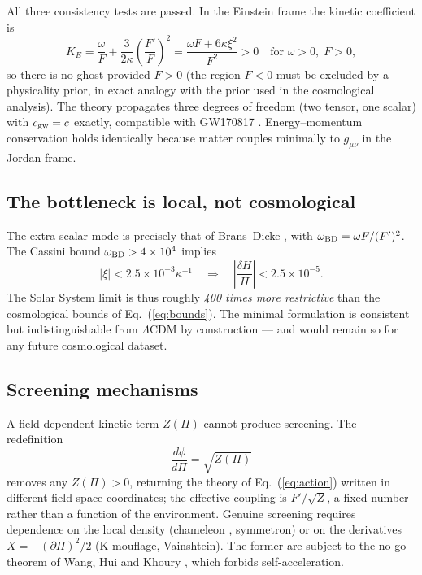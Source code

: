 \documentclass[aps,prd,twocolumn,superscriptaddress,nofootinbib,floatfix]{revtex4-2}
\newcommand{\LCDM}{\ensuremath{\Lambda}CDM}
\begin{document}
All three consistency tests are passed. In the Einstein frame the
kinetic coefficient is
%
\begin{equation}
K_E=\frac{\omega}{F}+\frac{3}{2\kappa}\left(\frac{F'}{F}\right)^2
=\frac{\omega F+6\kappa\xi^2}{F^2}>0
\quad\text{for }\omega>0,\;F>0,
\label{eq:noghost}
\end{equation}
%
so there is no ghost provided $F>0$ (the region $F<0$ must be excluded
by a physicality prior, in exact analogy with the prior used in the
cosmological analysis). The theory propagates three degrees of freedom
(two tensor, one scalar) with $c_{\rm gw}=c$ exactly, compatible with
GW170817 \cite{GW170817}. Energy--momentum conservation holds
identically because matter couples minimally to $g_{\mu\nu}$ in the
Jordan frame.

\subsection{The bottleneck is local, not cosmological}

The extra scalar mode is precisely that of Brans--Dicke
\cite{BransDicke1961}, with
$\omega_{\rm BD}=\omega F/(F')^2$. The Cassini bound
$\omega_{\rm BD}>4\times10^4$ \cite{Bertotti2003} implies
%
\begin{equation}
|\xi|<2.5\times10^{-3}\kappa^{-1}
\quad\Longrightarrow\quad
\left|\frac{\delta H}{H}\right|<2.5\times10^{-5}.
\label{eq:cassini}
\end{equation}
%
The Solar System limit is thus roughly \emph{400 times more
restrictive} than the cosmological bounds of Eq.~(\ref{eq:bounds}). The
minimal formulation is consistent but indistinguishable from \LCDM{} by
construction --- and would remain so for any future cosmological
dataset.

\subsection{Screening mechanisms}

A field-dependent kinetic term $Z(\Pi)$ cannot produce screening. The
redefinition
%
\begin{equation}
\frac{d\phi}{d\Pi}=\sqrt{Z(\Pi)}
\label{eq:redef}
\end{equation}
%
removes any $Z(\Pi)>0$, returning the theory of
Eq.~(\ref{eq:action}) written in different field-space coordinates; the
effective coupling is $F'/\sqrt{Z}$, a fixed number rather than a
function of the environment. Genuine screening requires dependence on
the local density (chameleon \cite{Khoury2004}, symmetron) or on the
derivatives $X=-(\partial\Pi)^2/2$ (K-mouflage, Vainshtein). The former
are subject to the no-go theorem of Wang, Hui and Khoury
\cite{Wang2012}, which forbids self-acceleration.
\end{document}
